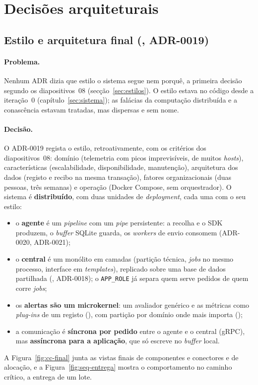 \section{Decisões arquiteturais}
\label{sec:decisoes}

\subsection{Estilo e arquitetura final (, ADR-0019)}
\label{sec:d20}

\paragraph{Problema.}
Nenhum ADR dizia que estilo o sistema segue nem porquê, a primeira decisão segundo os diapositivos~08
(secção~\ref{sec:estilos}). O estilo estava no código desde a iteração~0 (capítulo~\ref{sec:sistema}); as falácias
da computação distribuída e a conascência estavam tratadas, mas dispersas e sem nome.

\paragraph{Decisão.}
O ADR-0019 regista o estilo, retroativamente, com os critérios dos diapositivos~08: domínio (telemetria com picos
imprevisíveis, de muitos \emph{hosts}), características (escalabilidade, disponibilidade, manutenção),
arquitetura dos dados (registo e recibo na mesma transação), fatores organizacionais (duas pessoas, três semanas) e
operação (Docker Compose, sem orquestrador). O sistema é \textbf{distribuído}, com duas unidades de
\emph{deployment}, cada uma com o seu estilo:
\begin{itemize}
\item o \textbf{agente} é um \emph{pipeline} com um \emph{pipe} persistente: a recolha e o SDK produzem, o
\emph{buffer} SQLite guarda, os \emph{workers} de envio consomem (ADR-0020, ADR-0021);
\item o \textbf{central} é um monólito em camadas (partição técnica, \emph{jobs} no mesmo processo, interface em
\emph{templates}), replicado sobre uma base de dados partilhada (, ADR-0018); o \texttt{APP\_ROLE} já separa
quem serve pedidos de quem corre \emph{jobs};
\item os \textbf{alertas são um microkernel}: um avaliador genérico e as métricas como \emph{plug-ins} de um registo
(), com partição por domínio onde mais importa ();
\item a comunicação é \textbf{síncrona por pedido} entre o agente e o central (gRPC), mas \textbf{assíncrona para a
aplicação}, que só escreve no \emph{buffer} local.
\end{itemize}
A Figura~\ref{fig:cc-final} junta as vistas finais de componentes e conectores e de alocação, e a
Figura~\ref{fig:seq-entrega} mostra o comportamento no caminho crítico, a entrega de um lote.

